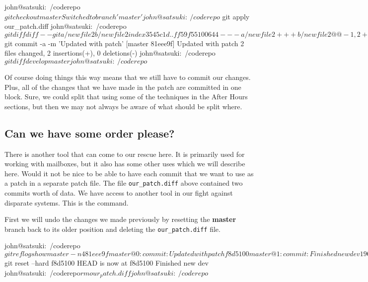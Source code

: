 \begin{code}
john@satsuki:~/coderepo$ git checkout master
Switched to branch 'master'
john@satsuki:~/coderepo$ git apply our_patch.diff
john@satsuki:~/coderepo$ git diff
diff --git a/newfile2 b/newfile2
index 3545c1d..ff59f55 100644
--- a/newfile2
+++ b/newfile2
@@ -1,2 +1,3 @@
 Another new file
 and a new awesome feature
+newer dev work
diff --git a/newfile3 b/newfile3
index 638113c..2e00739 100644
--- a/newfile3
+++ b/newfile3
@@ -1 +1,2 @@
 These changes are in the origin
+new dev work
john@satsuki:~/coderepo$ git commit -a -m 'Updated with patch'
[master 81eee9f] Updated with patch
 2 files changed, 2 insertions(+), 0 deletions(-)
john@satsuki:~/coderepo$ git diff develop master
john@satsuki:~/coderepo$
\end{code}

Of course doing things this way means that we still have to commit our changes.
Plus, all of the changes that we have made in the patch are committed in one block.
Sure, we could split that using some of the techniques in the After Hours sections, but then we may not always be aware of what should be split where.

\subsection{Can we have some order please?}

There is another tool that can come to our rescue here.
It is primarily used for working with  mailboxes, but it also has some other uses which we will describe here.
Would it not be nice to be able to have each commit that we want to use as a patch in a separate patch file.
The file \texttt{our\_patch.diff} above contained two commits worth of data.
We have access to another tool in our fight against disparate systems.
This is the  command.

First we will undo the changes we made previously by resetting the \textbf{master} branch back to its older position and deleting the \texttt{our\_patch.diff} file.

\begin{code}
john@satsuki:~/coderepo$ git reflog show master -n 4
81eee9f master@{0}: commit: Updated with patch
f8d5100 master@{1}: commit: Finished new dev
1968324 master@{2}: commit: Start new dev
john@satsuki:~/coderepo$ git reset --hard f8d5100
HEAD is now at f8d5100 Finished new dev
john@satsuki:~/coderepo$ rm our_patch.diff
john@satsuki:~/coderepo$
\end{code}

